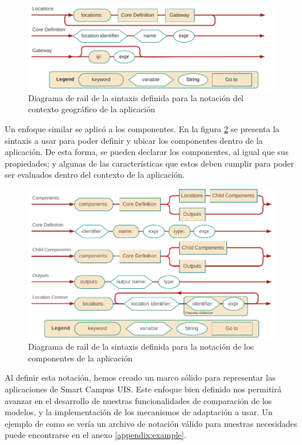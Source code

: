 \begin{figure}[H]
    \centering
    \caption{Diagrama de rail de la sintaxis definida para la notación del contexto geográfico de la aplicación}
    \label{fig:rail-location}
    \vspace{2mm}
    \includegraphics[width=0.9\linewidth]{images/Railroad Locations Alt.pdf}
\end{figure}

Un enfoque similar se aplicó a los componentes. En la figura \ref{fig:rail-components} se presenta la sintaxis a usar para poder definir y ubicar los componentes dentro de la aplicación. De esta forma, se pueden declarar los componentes, al igual que sus propiedades; y algunas de las características que estos deben cumplir para poder ser evaluados dentro del contexto de la aplicación.

\begin{figure}[H]
    \centering
    \caption{Diagrama de rail de la sintaxis definida para la notación de los componentes de la aplicación}
    \label{fig:rail-components}
    \vspace{2mm}
    \includegraphics[width=0.9\linewidth]{images/Railroad Components Alt.pdf}
\end{figure}

Al definir esta notación, hemos creado un marco sólido para representar las aplicaciones de Smart Campus UIS. Este enfoque bien definido nos permitirá avanzar en el desarrollo de nuestras funcionalidades de comparación de los modelos, y la implementación de los mecanismos de adaptación a usar. Un ejemplo de como se vería un archivo de notación válido para nuestras necesidades puede encontrarse en el anexo \ref{appendix:example}. 

